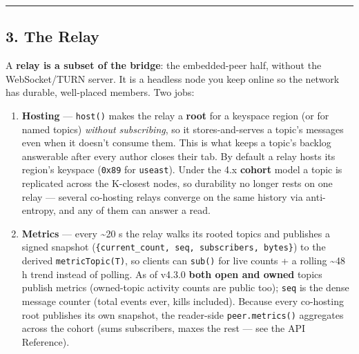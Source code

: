 \documentclass[
  nobib]{tufte-handout}
\providecommand{\tightlist}{%
  \setlength{\itemsep}{0pt}\setlength{\parskip}{0pt}}
\renewcommand{\subsubsection}[1]{\medskip\par\noindent{\normalsize\bfseries #1}\par\nobreak\smallskip}
\begin{document}
\begin{center}\rule{0.5\linewidth}{0.5pt}\end{center}

\subsection{3. The Relay}\label{the-relay}

\subsubsection{What it is}\label{what-it-is-1}

A \textbf{relay is a subset of the bridge}: the embedded-peer half,
without the WebSocket/TURN server. It is a headless node you keep online
so the network has durable, well-placed members. Two jobs:

\begin{enumerate}
\def\labelenumi{\arabic{enumi}.}
\tightlist
\item
  \textbf{Hosting} --- \texttt{host()} makes the relay a \textbf{root}
  for a keyspace region (or for named topics) \emph{without
  subscribing}, so it stores-and-serves a topic's messages even when it
  doesn't consume them. This is what keeps a topic's backlog answerable
  after every author closes their tab. By default a relay hosts its
  region's keyspace (\texttt{0x89} for \texttt{useast}). Under the 4.x
  \textbf{cohort} model a topic is replicated across the K-closest
  nodes, so durability no longer rests on one relay --- several
  co-hosting relays converge on the same history via anti-entropy, and
  any of them can answer a read.
\item
  \textbf{Metrics} --- every \textasciitilde20 s the relay walks its
  rooted topics and publishes a signed snapshot
  (\texttt{\{current\_count,\ seq,\ subscribers,\ bytes\}}) to the
  derived \texttt{metricTopic(T)}, so clients can \texttt{sub()} for
  live counts + a rolling \textasciitilde48 h trend instead of polling.
  As of v4.3.0 \textbf{both open and owned} topics publish metrics
  (owned-topic activity counts are public too); \texttt{seq} is the
  dense message counter (total events ever, kills included). Because
  every co-hosting root publishes its own snapshot, the reader-side
  \texttt{peer.metrics()} aggregates across the cohort (sums
  subscribers, maxes the rest --- see the API Reference).
\end{enumerate}

\subsubsection{Running one}\label{running-one-1}
\end{document}
